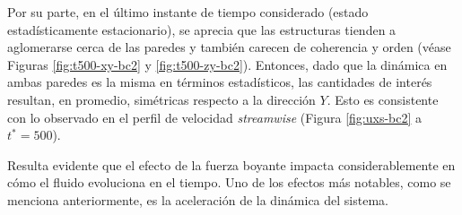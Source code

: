 Por su parte, en el último instante de tiempo considerado (estado estadísticamente estacionario), se aprecia que las estructuras  tienden a aglomerarse cerca de las paredes y también carecen de coherencia y orden (véase Figuras \ref{fig:t500-xy-bc2} y \ref{fig:t500-zy-bc2}). Entonces, dado que la dinámica en ambas paredes es la misma en términos estadísticos, las cantidades de interés resultan, en promedio, simétricas respecto a la dirección $Y$. Esto es consistente con lo observado en el perfil de velocidad \textit{streamwise} (Figura \ref{fig:uxs-bc2} a $t^*=500$).

Resulta evidente que el efecto de la fuerza boyante impacta considerablemente en cómo el fluido evoluciona en el tiempo. Uno de los efectos más notables, como se menciona anteriormente, es la aceleración de la dinámica del sistema. 

